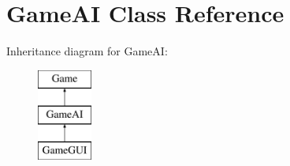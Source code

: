 \hypertarget{classGameAI}{\section{Game\+A\+I Class Reference}
\label{classGameAI}
}
Inheritance diagram for Game\+A\+I\+:\begin{figure}[H]
\begin{center}
\leavevmode
\includegraphics[height=3.000000cm]{classGameAI}
\end{center}
\end{figure}

